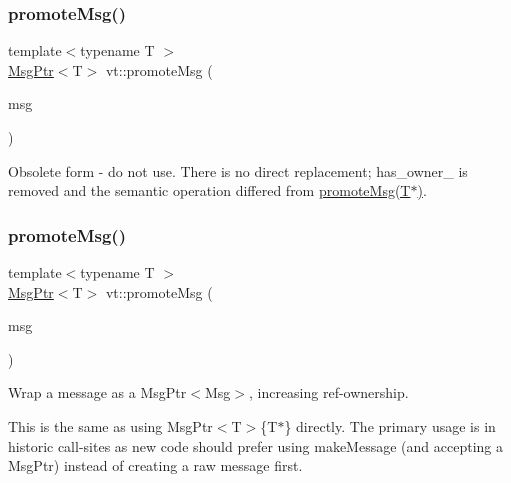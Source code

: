 \subsubsection{\texorpdfstring{promote\+Msg()}{promoteMsg()}\hspace{0.1cm}{\footnotesize\ttfamily [1/2]}}
{\footnotesize\ttfamily template$<$typename T $>$ \\
\hyperlink{namespacevt_a9f5ebd62ee9d6dd8829e3e1cc4f858e9}{Msg\+Ptr}$<$T$>$ vt\+::promote\+Msg (\begin{DoxyParamCaption}\item[{\hyperlink{namespacevt_a9f5ebd62ee9d6dd8829e3e1cc4f858e9}{Msg\+Ptr}$<$ T $>$}]{msg }\end{DoxyParamCaption})\hspace{0.3cm}{\ttfamily [inline]}}

Obsolete form -\/ do not use. There is no direct replacement; has\+\_\+owner\+\_\+ is removed and the semantic operation differed from \hyperlink{namespacevt_a991383de8a150393ef67012fbe689dd0}{promote\+Msg(\+T$\ast$)}. \mbox{\label{namespacevt_a991383de8a150393ef67012fbe689dd0}} 
\subsubsection{\texorpdfstring{promote\+Msg()}{promoteMsg()}\hspace{0.1cm}{\footnotesize\ttfamily [2/2]}}
{\footnotesize\ttfamily template$<$typename T $>$ \\
\hyperlink{namespacevt_a9f5ebd62ee9d6dd8829e3e1cc4f858e9}{Msg\+Ptr}$<$T$>$ vt\+::promote\+Msg (\begin{DoxyParamCaption}\item[{T $\ast$}]{msg }\end{DoxyParamCaption})\hspace{0.3cm}{\ttfamily [inline]}}



Wrap a message as a Msg\+Ptr$<$\+Msg$>$, increasing ref-\/ownership. 

This is the same as using Msg\+Ptr$<$\+T$>$\{T$\ast$\} directly. The primary usage is in historic call-\/sites as new code should prefer using {\ttfamily make\+Message} (and accepting a Msg\+Ptr) instead of creating a raw message first. \mbox{\label{namespacevt_a67418c428a6a98bdc05c264ef8517dd4}} 
